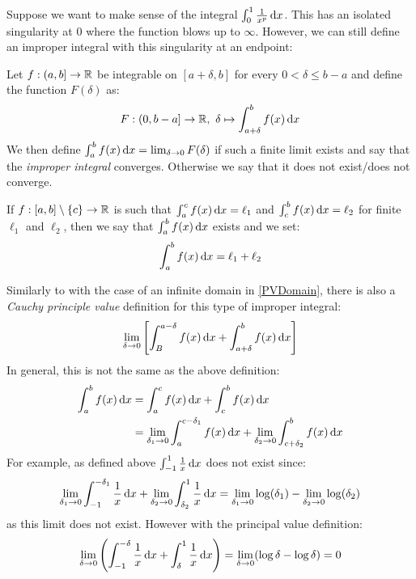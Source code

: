 \documentclass[../main.tex]{subfiles}
\begin{document}
Suppose we want to make sense of the integral $\int_{0}^{1} \frac{1}{x^{p}} \d{x}$.
This has an isolated singularity at $0$ where the function blows up to $\infty$.
However, we can still define an improper integral with this singularity at an endpoint:
\begin{definition}
  Let $f: (a, b] \to \mathbb{R}$ be integrable on $[a + \delta, b]$ for every $0 < \delta \leq b - a$ and define the function $F(\delta)$ as:
  \[
    F: (0, b - a] \to \R,\ \delta \mapsto \int_{a + \delta}^{b} f(x) \d{x}
  \]
  We then define $\int_{a}^{b} f(x) \d{x} = \lim_{\delta \to 0} F(\delta)$ if such a finite limit exists and say that the \textit{improper integral} converges.
  Otherwise we say that it does not exist/does not converge.
\end{definition}
\begin{definition}
  If $f: [a, b] \setminus \{c\} \to \mathbb{R}$ is such that $\int_{a}^{c} f(x) \d{x} = \ell_1$ and $\int_{c}^{b}  f(x) \d{x} = \ell_2$ for finite $\ell_1$ and $\ell_2$, then we say that $\int_{a}^{b} f(x) \d{x}$ exists and we set:
  \[
    \int_{a}^{b} f(x) \d{x} = \ell_1 + \ell_2
  \]
\end{definition}
\begin{remark}
  Similarly to with the case of an infinite domain in \cref{PVDomain}, there is also a \textit{Cauchy principle value} definition for this type of improper integral:
  \[
    \lim_{\delta \to 0} \left[\int_{B}^{a -\delta} f(x) \d{x} + \int_{a + \delta}^{b} f(x) \d{x}\right]
  \]
  In general, this is not the same as the above definition:
  \begin{align*}
    \int_{a}^{b} f(x) \d{x} &= \int_{a}^{c} f(x) \d{x} + \int_{c}^{b} f(x) \d{x} \\
                            &= \lim_{\delta_1 \to 0} \int_{a}^{c - \delta_1} f(x) \d{x} + \lim_{\delta_2 \to 0} \int_{c + \delta_2}^{b} f(x) \d{x}
  \end{align*}
  For example, as defined above $\int_{-1}^{1} \frac{1}{x} \d{x}$ does not exist since:
  \[
    \lim_{\delta_1 \to 0} \int_{-1}^{-\delta_1} \frac{1}{x} \d{x} + \lim_{\delta_2 \to 0} \int_{\delta_2}^{1} \frac{1}{x} \d{x} = \lim_{\delta_1 \to 0} \log(\delta_1) - \lim_{\delta_2 \to 0} \log(\delta_2)
  \]
  as this limit does not exist.
  However with the principal value definition:
  \[
    \lim_{\delta \to 0} \left(\int_{-1}^{-\delta} \frac{1}{x} \d{x} + \int_{\delta}^{1} \frac{1}{x} \d{x}\right) = \lim_{\delta \to 0} (\log \delta - \log \delta) = 0
  \]
\end{remark}
\end{document}
